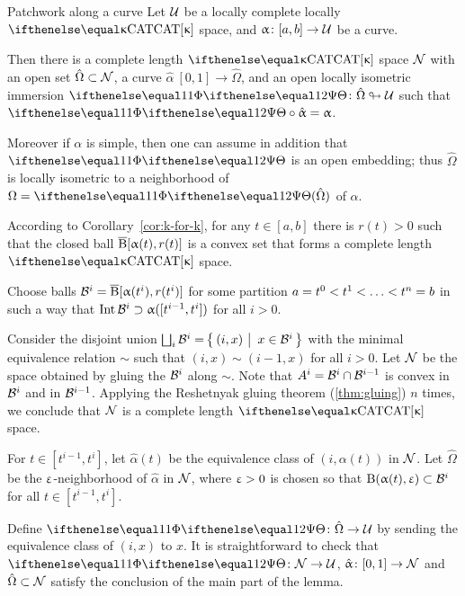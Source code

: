 \begin{thm}{Patchwork along a curve}
\label{lem:patch}
Let $\mathcal{U}$ be a locally complete locally $\CAT\kappa$ space, 
and $\alpha\:[a,b]\to\spc{U}$ be a curve.

Then there is a complete length $\CAT\kappa$ space $\mathcal{N}$
with an open set $\hat\Omega\subset \spc{N}$,
a curve $\hat\alpha\:[0,1]\to\hat\Omega$,
and an open locally isometric immersion 
 $\map\:\hat\Omega\looparrowright\spc{U}$ such that
$\map\circ\hat\alpha=\alpha$.

Moreover if $\alpha$ is simple, then one can assume in addition that $\map$ is an open embedding;
thus $\hat\Omega$ is locally isometric to a neighborhood of $\Omega=\map(\hat\Omega)$ of $\alpha$.
\end{thm}



According to Corollary~\ref{cor:k-for-k},
for any $t\in[a,b]$ there is $r(t)>0$ 
such that the closed ball
$\overline{\mathrm{B}}{}[\upalpha(t),r(t)]$ is a  convex set  that forms a complete length $\CAT\kappa$ space.

Choose balls $\mathcal{B}^i=\overline{\mathrm{B}}{}[\upalpha(t^i),r(t^i)]$
for some partition $a\z=t^0<t^1<\dots<t^n\z=b$
in such a way that 
$\Int\spc{B}^i\supset \alpha([t^{i-1},t^i])$ for all $i>0$.

Consider the disjoint union $\bigsqcup_i\spc{B}^i=\set{(i,x)}{x\in\spc{B}^i}$ with the minimal equivalence relation $\sim$ such that $(i,x)\sim(i-1,x)$ for all $i>0$.
Let  $\mathcal{N}$ be the space obtained by gluing the $\mathcal{B}^i$ along $\sim$.
Note that $A^i=\spc{B}^i\cap\spc{B}^{i-1}$ is convex in $\mathcal{B}^i$ and in $\mathcal{B}^{i-1}$.
Applying the Reshetnyak gluing theorem (\ref{thm:gluing}) $n$ times, 
we conclude that $\mathcal{N}$ is a complete length $\CAT\kappa$ space.

For $t\in[t^{i-1},t^i]$, let $\hat\alpha(t)$  be the equivalence class of $(i,\alpha(t))$ in $\mathcal{N}$.
Let $\hat\Omega$ be the $\upvarepsilon$-neighborhood of $\hat\alpha$ in $\mathcal{N}$, where $\upvarepsilon>0$ is chosen so that $\oBall(\alpha(t),\eps)\subset\spc{B}^i$ for all $t\in[t^{i-1},t^i]$.

Define $\map\:\hat\Omega\to\spc{U}$
by sending the equivalence class of $(i,x)$ to $x$.
It is straightforward to check that $\map\:\spc{N}\to\spc{U}$, $\hat\alpha\:[0,1]\to\spc{N}$ and $\hat\Omega\subset\spc{N}$ satisfy the conclusion of the main part of the lemma.

